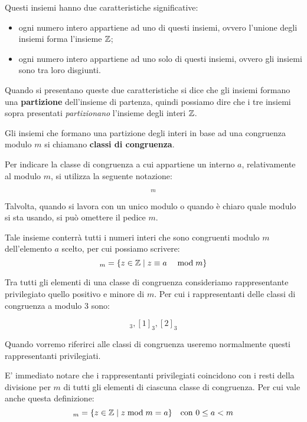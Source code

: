Questi insiemi hanno due caratteristiche significative:
\begin{itemize}
    \item ogni numero intero appartiene ad uno di questi insiemi, ovvero l'unione degli insiemi forma l'insieme $ \mathbb{Z} $;
    \item ogni numero intero appartiene ad uno solo di questi insiemi, ovvero gli insiemi sono tra loro disgiunti.
\end{itemize}

Quando si presentano queste due caratteristiche si dice che gli insiemi formano una \textbf{partizione} dell'insieme di partenza, quindi possiamo dire che i tre insiemi sopra presentati \emph{partizionano} l'insieme degli interi $ \mathbb{Z} $.

    \begin{definizione}
        Gli insiemi che formano una partizione degli interi in base ad una congruenza modulo $m$ si chiamano \textbf{classi di congruenza}.
    \end{definizione}

Per indicare la classe di congruenza a cui appartiene un interno $a$, relativamente al modulo $m$, si utilizza la seguente notazione:

\begin{equation*}
    [a]_m
\end{equation*}

Talvolta, quando si lavora con un unico modulo o quando è chiaro quale modulo si sta usando, si può omettere il pedice $m$.

Tale insieme conterrà tutti i numeri interi che sono congruenti modulo $m$ dell'elemento $a$ scelto, per cui possiamo scrivere:
\begin{equation*}
    [a]_m = \{z \in \Z \mid \congruenti{z}{a}{m}\}
\end{equation*}

Tra tutti gli elementi di una classe di congruenza consideriamo rappresentante privilegiato quello positivo e minore di $m$. Per cui i rappresentanti delle classi di congruenza a modulo 3 sono:

\begin{equation*}
    [0]_3, [1]_3, [2]_3
\end{equation*}

Quando vorremo riferirci alle classi di congruenza useremo normalmente questi rappresentanti privilegiati.

E' immediato notare che i rappresentanti privilegiati coincidono con i resti della divisione per $m$ di tutti gli elementi di ciascuna classe di congruenza. Per cui vale anche questa definizione:
\begin{equation*}
    [a]_m = \{z \in \Z \mid z \modulo m = a\} \quad \text{con } 0 \le a < m
\end{equation*}


